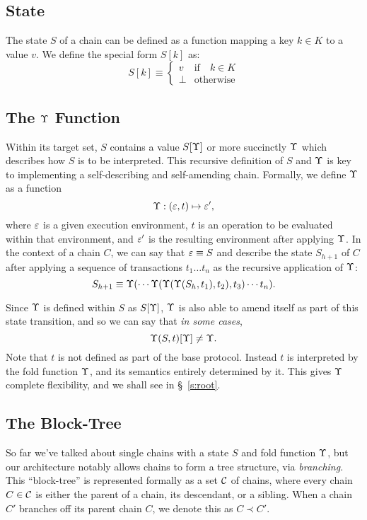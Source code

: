 \subsection{State}

The state $S$ of a chain can be defined as a function mapping a key $k \in K$ to a
value $v$. We define the special form $S[k]$ as:
\[
    S[k] \equiv \begin{cases}
        v                   & \text{if} \quad k \in K \\
        \bot                & \text{otherwise}
    \end{cases}
\]

\subsection{The $\Upsilon$ Function} \label{fold-function}

Within its target set, $S$ contains a value $S[\Upsilon]$ or more succinctly
$\Upsilon$ which describes how $S$ is to be interpreted. This recursive definition
of $S$ and $\Upsilon$ is key to implementing a self-describing and self-amending
chain. Formally, we define $\Upsilon$ as a function
\[
    \Upsilon : (\varepsilon, t) \mapsto \varepsilon',
\]
where $\varepsilon$ is a given execution environment, $t$ is an operation to be
evaluated within that environment, and $\varepsilon'$ is the resulting environment
after applying $\Upsilon$.  In the context of a chain $C$, we can say that $\varepsilon
\equiv S$ and describe the state $S_{h+1}$ of $C$ after applying a
sequence of transactions $t_1 \dots t_n$ as the recursive application of $\Upsilon$:
\[
    S_{h+1} \equiv \Upsilon(\cdots \Upsilon(\Upsilon(\Upsilon(S_h,
    t_1), t_2), t_3) \cdots t_n).
\]

Since $\Upsilon$ is defined within $S$ as $S[\Upsilon]$, $\Upsilon$ is also
able to amend itself as part of this state transition, and so we can say that
\emph{in some cases},
\[
    \Upsilon(S, t)[\Upsilon] \neq \Upsilon.
\]
Note that $t$ is not defined as part of the base protocol. Instead $t$ is
interpreted by the fold function $\Upsilon$, and its semantics entirely determined
by it. This gives $\Upsilon$ complete flexibility, and we shall see in
\S~\ref{s:root}.

\subsection{The Block-Tree}

So far we've talked about single chains with a state $S$ and fold function
$\Upsilon$, but our architecture notably allows chains to form a tree structure,
via \emph{branching}. This ``block-tree'' is represented formally as a set
$\mathcal{C}$ of chains, where every chain $C \in \mathcal{C}$ is either the parent of a
chain, its descendant, or a sibling. When a chain $C'$ branches off its parent
chain $C$, we denote this as $C \prec C'$.

